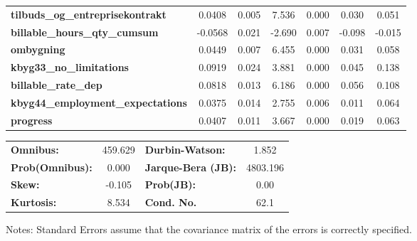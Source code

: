 \begin{center}
\begin{tabular}{lcccccc}
\textbf{tilbuds\_og\_entreprisekontrakt}  &       0.0408  &        0.005     &     7.536  &         0.000        &        0.030    &        0.051     \\
\textbf{billable\_hours\_qty\_cumsum}     &      -0.0568  &        0.021     &    -2.690  &         0.007        &       -0.098    &       -0.015     \\
\textbf{ombygning}                        &       0.0449  &        0.007     &     6.455  &         0.000        &        0.031    &        0.058     \\
\textbf{kbyg33\_no\_limitations}          &       0.0919  &        0.024     &     3.881  &         0.000        &        0.045    &        0.138     \\
\textbf{billable\_rate\_dep}              &       0.0818  &        0.013     &     6.186  &         0.000        &        0.056    &        0.108     \\
\textbf{kbyg44\_employment\_expectations} &       0.0375  &        0.014     &     2.755  &         0.006        &        0.011    &        0.064     \\
\textbf{progress}                         &       0.0407  &        0.011     &     3.667  &         0.000        &        0.019    &        0.063     \\
\bottomrule
\end{tabular}
\begin{tabular}{lclc}
\textbf{Omnibus:}       & 459.629 & \textbf{  Durbin-Watson:     } &    1.852  \\
\textbf{Prob(Omnibus):} &   0.000 & \textbf{  Jarque-Bera (JB):  } & 4803.196  \\
\textbf{Skew:}          &  -0.105 & \textbf{  Prob(JB):          } &     0.00  \\
\textbf{Kurtosis:}      &   8.534 & \textbf{  Cond. No.          } &     62.1  \\
\bottomrule
\end{tabular}
\end{center}

Notes: \newline
 [1] Standard Errors assume that the covariance matrix of the errors is correctly specified.